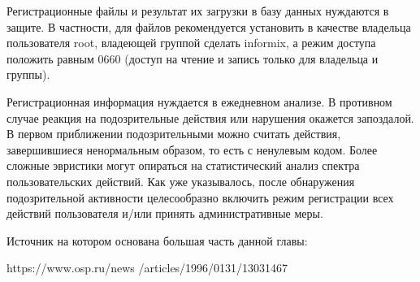 Регистрационные файлы и результат их загрузки в базу данных нуждаются в защите. В частности, для файлов рекомендуется установить в качестве владельца пользователя root, владеющей группой сделать informix, а режим доступа положить равным 0660 (доступ на чтение и запись только для владельца и группы).

Регистрационная информация нуждается в ежедневном анализе. В противном случае реакция на подозрительные действия или нарушения окажется запоздалой. В первом приближении подозрительными можно считать действия, завершившиеся ненормальным образом, то есть с ненулевым кодом. Более сложные эвристики могут опираться на статистический анализ спектра пользовательских действий. Как уже указывалось, после обнаружения подозрительной активности целесообразно включить режим регистрации всех действий пользователя и/или принять административные меры.

Источник на котором основана большая часть данной главы:

https://www.osp.ru/news
/articles/1996/0131/13031467

